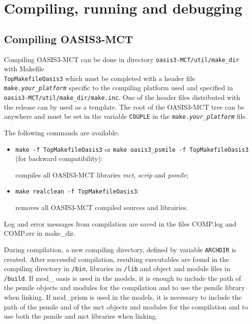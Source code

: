 \newpage
%

\chapter{Compiling, running and debugging}
\label{sec_compilationrunning}

\section{Compiling OASIS3-MCT}
\label{subsec_compile}

Compiling OASIS3-MCT can be done in directory {\tt oasis3-MCT/util/make\_dir}
with Makefile \\ {\tt TopMakefileOasis3} which must be completed with a header file {\tt
  make.{\it your\_platform}} specific to the compiling platform used
and specified in {\tt oasis3-MCT/util/make\_dir/make.inc}.  One of the
header files distributed with the release can by used as a template.  The root 
of the OASIS3-MCT tree
can be anywhere and must be set in the variable {\tt COUPLE} in the
{\tt make.{\it your\_platform}} file. 

The following commands are available:

\begin{itemize}
\item {\tt make -f TopMakefileOasis3} or {\tt make oasis3\_psmile -f
  TopMakefileOasis3} (for backward compatibility):

  compiles all OASIS3-MCT libraries {\it mct}, {\it scrip} and {\it psmile}; 

\item {\tt make realclean -f  TopMakefileOasis3}: 

  removes all OASIS3-MCT compiled sources and librairies.

\end{itemize}

Log and error messages from compilation are saved in the files
COMP.log and COMP.err in make\_dir.

During compilation, a new compiling directory, defined by variable {\tt ARCHDIR}
is created.  After successful
compilation, resulting executables are found in the compiling directory in {\tt /bin}, libraries in {\tt /lib} and object
and module files in {\tt /build}. If mod\_ oasis is used in the models, it is enough to include the path of the psmile
objects and modules for the compilation and to use the psmile library when linking. If mod\_prism is used in the models, it is 
necessary to include the path of the psmile and of the mct objects and modules for the compilation and to use both the psmile and 
mct libraries when linking.

